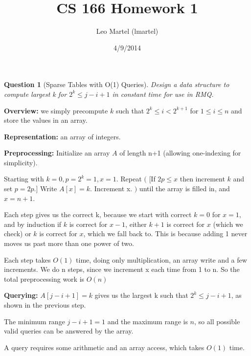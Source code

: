 \documentclass{article}
\title{CS 166 Homework 1}
\author{Leo Martel (lmartel)}
\date{4/9/2014}
\newtheorem{ques}{Question}
\renewcommand{\b}[1]{\textbf{#1}}
\begin{document}
\maketitle

\begin{ques}[Sparse Tables with O(1) Queries]
Design a data structure to compute largest k for $2^k \le j - i + 1$ in constant time for use in RMQ.
\end{ques}
\b{Overview:} we simply precompute $k$ such that $2^k \le i < 2^{k+1}$ for $1 \le i \le n$ and store the values in an array.

\b{Representation:} an array of integers.

\b{Preprocessing:} Initialize an array $A$ of length n+1 (allowing one-indexing for simplicity). 

Starting with $k = 0, p = 2^k = 1, x = 1$. Repeat $\big($ [If $2p \le x$ then increment $k$ and set $p = 2p$.] Write $A[x] = k$. Increment x. $\big)$ until the array is filled in, and $x = n + 1$.

Each step gives us the correct k, because we start with correct $k=0$ for $x=1$, and by induction if $k$ is correct for $x - 1$, either $k+1$ is correct for $x$ (which we check) or $k$ is correct for $x$, which we fall back to. This is because adding 1 never moves us past more than one power of two.

Each step takes $O(1)$ time, doing only multiplication, an array write and a few increments. We do n steps, since we increment x each time from 1 to n. So the total preprocessing work is $O(n)$

\b{Querying:} $A[j - i + 1] = k$ gives us the largest k such that $2^k \le j - i + 1$, as shown in the previous step.

The minimum range $j - i + 1 = 1$ and the maximum range is $n$, so all possible valid queries can be answered by the array.

A query requires some arithmetic and an array access, which takes $O(1)$ time.
\end{document}
